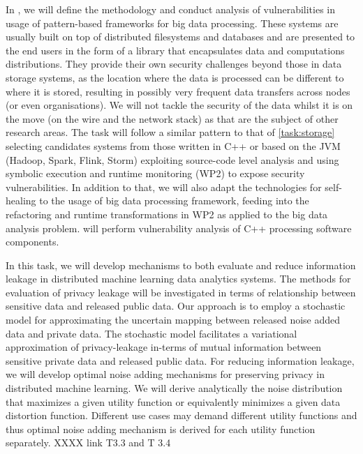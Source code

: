 \begin{Workpackage}{\thewpno}
\begin{Task}
 \TaskResults{%
 }
 \TaskHeader{}
 In \theTask, we will define the methodology and conduct analysis of vulnerabilities in usage of pattern-based frameworks for big data processing. These systems are usually built on top of distributed filesystems and databases and are presented to the end users in the form of a library that encapsulates data and computations distributions. They provide their own security challenges beyond those in data storage systems, as the location where the data is processed can be different to where it is stored, resulting in possibly very frequent data transfers across nodes (or even organisations). We will not tackle the security of the data whilst it is on the move (on the wire and the network stack) as that are the subject of other research areas.  The task will follow a similar pattern to that of \ref{task:storage} selecting candidates systems from those written in C++ or based on the JVM (Hadoop, Spark, Flink, Storm) exploiting source-code level analysis and using symbolic execution and runtime monitoring (WP2) to expose security vulnerabilities. In addition to that, we will also adapt the technologies for self-healing to the usage of big data processing framework, feeding into the refactoring and runtime transformations in WP2 as applied to the big data analysis problem.
\UCM will perform vulnerability analysis of C++ processing software components.
\end{Task}
 
\begin{Task}
  
  \TaskResults{%
  }
  \TaskHeader{}
  In this task, we will develop mechanisms to both evaluate and reduce information leakage in distributed machine learning data analytics systems. The methods for evaluation of privacy leakage will be investigated in terms of relationship between sensitive data and released public data. Our approach is to employ a stochastic model for approximating the uncertain mapping between released noise added data and private data. The stochastic model facilitates a variational approximation of privacy-leakage in-terms of mutual information between sensitive private data and released public data. For reducing information leakage, we will develop optimal noise adding mechanisms for preserving privacy in distributed machine learning. We will derive analytically the noise distribution that maximizes a given utility function or equivalently minimizes a given data distortion function. Different use cases may demand different utility functions and thus optimal noise adding mechanism is derived for each utility function separately.    XXXX link T3.3 and T 3.4
 \end{Task}


\end{Workpackage}
